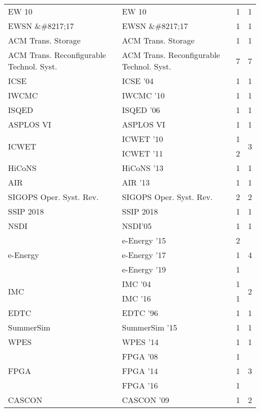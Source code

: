 \begin{table*}[t]
\begin{tabular}{llrr}
\multirow{1}{*}{EW 10} & EW 10 & 1 & \multirow{1}{*}{1}\\
\multirow{1}{*}{EWSN \&\#8217;17} & EWSN \&\#8217;17 & 1 & \multirow{1}{*}{1}\\
\multirow{1}{*}{ACM Trans. Storage} & ACM Trans. Storage & 1 & \multirow{1}{*}{1}\\
\multirow{1}{*}{ACM Trans. Reconfigurable Technol. Syst.} & ACM Trans. Reconfigurable Technol. Syst. & 7 & \multirow{1}{*}{7}\\
\multirow{1}{*}{ICSE } & ICSE '04 & 1 & \multirow{1}{*}{1}\\
\multirow{1}{*}{IWCMC } & IWCMC '10 & 1 & \multirow{1}{*}{1}\\
\multirow{1}{*}{ISQED } & ISQED '06 & 1 & \multirow{1}{*}{1}\\
\multirow{1}{*}{ASPLOS VI} & ASPLOS VI & 1 & \multirow{1}{*}{1}\\
\multirow{2}{*}{ICWET } & ICWET '10 & 1 & \multirow{2}{*}{3}\\
& ICWET '11 & 2 &\\
\multirow{1}{*}{HiCoNS } & HiCoNS '13 & 1 & \multirow{1}{*}{1}\\
\multirow{1}{*}{AIR } & AIR '13 & 1 & \multirow{1}{*}{1}\\
\multirow{1}{*}{SIGOPS Oper. Syst. Rev.} & SIGOPS Oper. Syst. Rev. & 2 & \multirow{1}{*}{2}\\
\multirow{1}{*}{SSIP 2018} & SSIP 2018 & 1 & \multirow{1}{*}{1}\\
\multirow{1}{*}{NSDI} & NSDI'05 & 1 & \multirow{1}{*}{1}\\
\multirow{3}{*}{e-Energy } & e-Energy '15 & 2 & \multirow{3}{*}{4}\\
& e-Energy '17 & 1 &\\
& e-Energy '19 & 1 &\\
\multirow{2}{*}{IMC } & IMC '04 & 1 & \multirow{2}{*}{2}\\
& IMC '16 & 1 &\\
\multirow{1}{*}{EDTC } & EDTC '96 & 1 & \multirow{1}{*}{1}\\
\multirow{1}{*}{SummerSim } & SummerSim '15 & 1 & \multirow{1}{*}{1}\\
\multirow{1}{*}{WPES } & WPES '14 & 1 & \multirow{1}{*}{1}\\
\multirow{3}{*}{FPGA } & FPGA '08 & 1 & \multirow{3}{*}{3}\\
& FPGA '14 & 1 &\\
& FPGA '16 & 1 &\\
\multirow{2}{*}{CASCON } & CASCON '09 & 1 & \multirow{2}{*}{2}\\

\end{tabular}
\end{table*}
